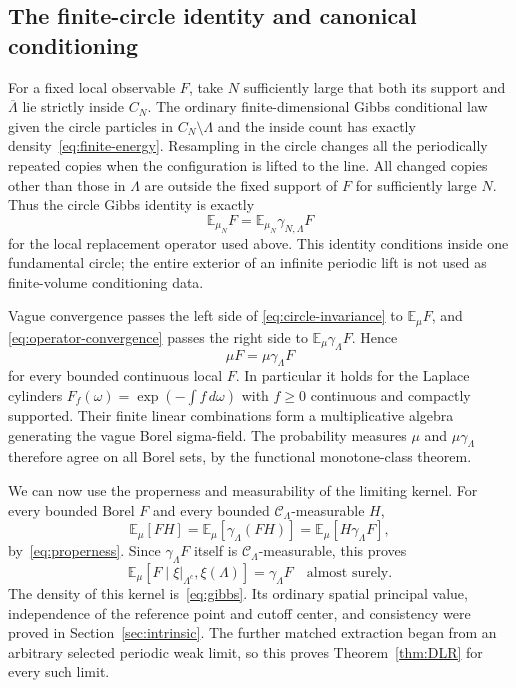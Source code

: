 \documentclass[11pt]{article}
\theoremstyle{remark}\newtheorem{remark}[theorem]{Remark}
\newcommand{\E}{\mathbb E}
\begin{document}
\subsection{The finite-circle identity and canonical conditioning}

For a fixed local observable $F$, take $N$ sufficiently large
that both its support and $\overline\Lambda$ lie strictly inside
$C_N$. The ordinary finite-dimensional Gibbs conditional law
given the circle particles in $C_N\setminus\Lambda$ and the
inside count has exactly density~\eqref{eq:finite-energy}.
Resampling in the circle changes all the periodically repeated
copies when the configuration is lifted to the line. All changed
copies other than those in $\Lambda$ are outside the fixed
support of $F$ for sufficiently large $N$. Thus the circle Gibbs
identity is exactly
\begin{equation}\label{eq:circle-invariance}
 \E_{\mu_N}F=\E_{\mu_N}\gamma_{N,\Lambda}F
\end{equation}
for the local replacement operator used above. This identity
conditions inside one fundamental circle; the entire exterior
of an infinite periodic lift is not used as finite-volume
conditioning data.

Vague convergence passes the left side of
\eqref{eq:circle-invariance} to $\E_\mu F$, and
\eqref{eq:operator-convergence} passes the right side to
$\E_\mu\gamma_\Lambda F$. Hence
\[
 \mu F=\mu\gamma_\Lambda F
\]
for every bounded continuous local $F$. In particular it holds
for the Laplace cylinders
$F_f(\omega)=\exp(-\int f\,d\omega)$ with
$f\ge0$ continuous and compactly supported. Their finite linear
combinations form a multiplicative algebra generating the vague
Borel sigma-field. The probability measures $\mu$ and
$\mu\gamma_\Lambda$ therefore agree on all Borel sets, by the
functional monotone-class theorem.

We can now use the properness and measurability of the limiting
kernel. For every bounded Borel $F$ and every bounded
$\mathcal C_\Lambda$-measurable $H$,
\[
 \E_\mu[FH]
   =\E_\mu[\gamma_\Lambda(FH)]
   =\E_\mu[H\gamma_\Lambda F],
\]
by~\eqref{eq:properness}. Since $\gamma_\Lambda F$ itself is
$\mathcal C_\Lambda$-measurable, this proves
\begin{equation}\label{eq:DLR-conditional}
 \E_\mu[F\mid\xi|_{\Lambda^c},\xi(\Lambda)]
                    =\gamma_\Lambda F\quad\text{almost surely}.
\end{equation}
The density of this kernel is~\eqref{eq:gibbs}. Its ordinary
spatial principal value, independence of the reference point and
cutoff center, and consistency were proved in
Section~\ref{sec:intrinsic}. The further matched extraction began
from an arbitrary selected periodic weak limit, so this proves
Theorem~\ref{thm:DLR} for every such limit.
\end{document}
